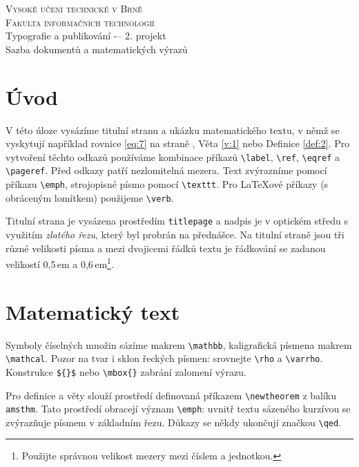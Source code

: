 \documentclass[a4paper,11pt,twocolumn]{article}
\begin{document}
\thispagestyle{empty}
\onecolumn
\begin{center}
    {\Huge\textsc{Vysoké učení technické v Brně}}\\[18pt]
    {\huge\textsc{Fakulta informačních technologií}}\\[250pt]
    
    {\huge Typografie a publikování -– 2. projekt}\\[5pt]
    {\huge Sazba dokumentů a matematických výrazů}
\end{center}

\vfill

\clearpage

\setcounter{page}{1}
\twocolumn

\section*{Úvod}
V této úloze vysázíme titulní stranu a ukázku matematického textu,
v němž se vyskytují například
rovnice \eqref{eq:7} na straně \pageref{eq:1}, Věta \ref{v:1} nebo Definice \ref{def:2}.
Pro vytvoření těchto odkazů používáme kombinace příkazů
\verb|\label|, \verb|\ref|, \verb|\eqref| a \verb|\pageref|.
Před odkazy patří nezlomitelná mezera.
Text zvýrazníme pomocí příkazu \verb|\emph|, strojopisné písmo pomocí \verb|\texttt|.
Pro \LaTeX ové příkazy (s obráceným lomítkem) použijeme \verb|\verb|.

Titulní strana je vysázena prostředím \texttt{titlepage} a nadpis je v optickém středu
s využitím \textit{zlatého řezu}, který byl probrán na přednášce.
Na titulní straně jsou tři různé velikosti písma a mezi dvojicemi řádků textu
je řádkování se zadanou  velikostí 0,5\,em a 0,6\,em\footnote{Použijte správnou velikost mezery mezi číslem a jednotkou.}.

\section{Matematický text}
Symboly číselných množin sázíme makrem \verb|\mathbb|,
kaligrafická písmena  makrem \verb|\mathcal|.
Pozor na tvar i sklon řeckých písmen: srovnejte \verb|\rho| a \verb|\varrho|.
Konstrukce \verb|${}$| nebo \verb|\mbox{}| zabrání zalomení výrazu.

Pro definice a věty slouží prostředí definovaná příkazem \verb|\newtheorem| z balíku \texttt{amsthm}.
Tato prostředí obracejí význam \verb|\emph|:
uvnitř textu sázeného kurzívou se zvýrazňuje písmem v základním řezu.
Důkazy se někdy ukončují značkou \verb|\qed|.
\end{document}
